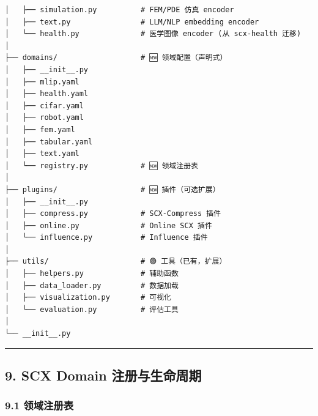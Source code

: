 \documentclass[
  12pt,
]{ctexart}
\begin{document}
\begin{verbatim}
│   ├── simulation.py          # FEM/PDE 仿真 encoder
│   ├── text.py                # LLM/NLP embedding encoder
│   └── health.py              # 医学图像 encoder (从 scx-health 迁移)
│
├── domains/                   # 🆕 领域配置（声明式）
│   ├── __init__.py
│   ├── mlip.yaml
│   ├── health.yaml
│   ├── cifar.yaml
│   ├── robot.yaml
│   ├── fem.yaml
│   ├── tabular.yaml
│   ├── text.yaml
│   └── registry.py            # 🆕 领域注册表
│
├── plugins/                   # 🆕 插件（可选扩展）
│   ├── __init__.py
│   ├── compress.py            # SCX-Compress 插件
│   ├── online.py              # Online SCX 插件
│   └── influence.py           # Influence 插件
│
├── utils/                     # 🟢 工具（已有，扩展）
│   ├── helpers.py             # 辅助函数
│   ├── data_loader.py         # 数据加载
│   ├── visualization.py       # 可视化
│   └── evaluation.py          # 评估工具
│
└── __init__.py
\end{verbatim}

\begin{center}\rule{0.5\linewidth}{0.5pt}\end{center}

\subsection{9. SCX Domain
注册与生命周期}\label{scx-domain-ux6ce8ux518cux4e0eux751fux547dux5468ux671f}

\subsubsection{9.1 领域注册表}\label{ux9886ux57dfux6ce8ux518cux8868}
\end{document}
